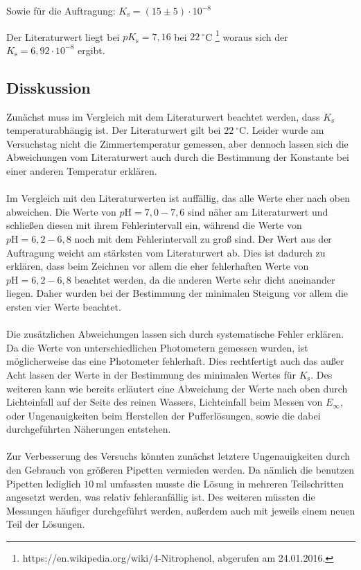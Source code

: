 \documentclass[12pt,a4paper,titlepage,headinclude,bibtotoc]{scrartcl}
\begin{document}
Sowie für die Auftragung: $K_{\mathrm{s}} = (15 \pm 5) \cdot 10^{-8} $

Der Literaturwert liegt bei $pK_{\mathrm{s}} = 7,16$ bei $22{~}^{\circ}$C \footnote{https://en.wikipedia.org/wiki/4-Nitrophenol, abgerufen am 24.01.2016.} woraus sich der $K_{\mathrm{s}} = 6,92 \cdot 10^{-8}$ ergibt.


\subsection{Disskussion}
Zunächst muss im Vergleich mit dem Literaturwert beachtet werden, dass $K_{\mathrm{s}}$ temperaturabhängig ist. Der Literaturwert gilt bei $22{~}^{\circ}$C. Leider wurde am Versuchstag nicht die Zimmertemperatur gemessen, aber dennoch lassen sich die Abweichungen vom Literaturwert auch durch die Bestimmung der Konstante bei einer anderen Temperatur erklären.\\\\

Im Vergleich mit den Literaturwerten ist auffällig, das alle Werte eher nach oben abweichen. Die Werte von $ p\mathrm{H} = 7,0- 7,6$ sind näher am Literaturwert und schließen diesen mit ihrem Fehlerintervall ein, während die Werte von $ p\mathrm{H} = 6,2- 6,8$ noch mit dem Fehlerintervall zu groß sind. Der Wert aus der Auftragung weicht am stärksten vom Literaturwert ab. Dies ist dadurch zu erklären, dass beim Zeichnen vor allem die eher fehlerhaften Werte von $ p\mathrm{H} = 6,2- 6,8$ beachtet werden, da die anderen Werte sehr dicht aneinander liegen. Daher wurden bei der Bestimmung der minimalen Steigung vor allem die ersten vier Werte beachtet.\\\\
Die zusätzlichen Abweichungen lassen sich durch systematische Fehler erklären. Da die Werte von unterschiedlichen Photometern gemessen wurden, ist möglicherweise das eine Photometer fehlerhaft. Dies rechtfertigt auch das außer Acht lassen der Werte in der Bestimmung des minimalen Wertes für $K_{\mathrm{s}}$. Des weiteren  kann wie bereits erläutert eine Abweichung der Werte nach oben durch Lichteinfall auf der Seite des reinen Wassers, Lichteinfall beim Messen von $E_{\infty}$, oder Ungenauigkeiten beim Herstellen der Pufferlösungen, sowie die dabei durchgeführten Näherungen entstehen.\\\\
Zur Verbesserung des Versuchs könnten zunächst letztere Ungenauigkeiten durch den Gebrauch von größeren Pipetten vermieden werden. Da nämlich die benutzen Pipetten lediglich $10{~} \mathrm{ml}$ umfassten musste die Lösung in mehreren Teilschritten angesetzt werden, was relativ fehleranfällig ist. Des weiteren müssten die Messungen häufiger durchgeführt werden, außerdem auch mit jeweils einem neuen Teil der Lösungen.
 
\end{document}
